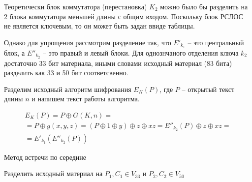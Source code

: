 \documentclass[a4paper,12pt]{article}
\theoremstyle{definition}
\begin{document}
	Теоретически блок коммутатора (перестановка) $K_2$ можно было бы разделить на 2 блока коммутатора меньшей длины с общим входом. Поскольку блок РСЛОС не является ключевым, то он может быть задан ввиде таблицы.
	
	Однако для упрощения рассмотрим разделение так, что $E'_{k_1}$ -- это центральный блок, а $E''_{k_2}$ -- это правый и левый блоки. Для однознчаного отделения ключа $k_2$ достаточно $33$ бит материала, иными словами исходный материал (83 бита) разделить как 33 и 50 бит соответсвенно.
	
	Разделим исходный алгоритм шифрования $E_K(P)$, где $P$ -- открытый текст длины $n$ и напишем текст работы алгоритма.

	\begin{multline*}	
	E_K(P) = P \oplus G(K, n) = \\ = P \oplus g(x,y,z) = (P \oplus 1 \oplus y) \oplus z \oplus x z = E''_{k_2}(P) \oplus z \oplus x z = \\ = E'_{k_1}(E''_{k_2}(P))
	\end{multline*}
	
	\begin{algorithm}[H]
		
		\caption{Метод встречи по середине}
		\label{alg:Midle}
		\SetAlgoNoEnd
		
		
		Разделить исходный материал на $P_1, C_1 \in V_{33}$ и $P_2, C_2 \in V_{50}$
		

	
	\end{algorithm}	
	
\end{document}
